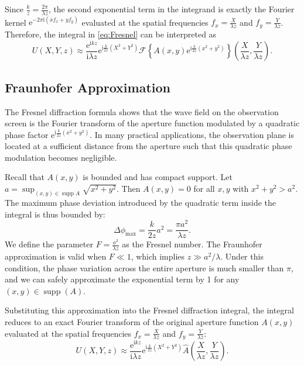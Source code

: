 \documentclass[12pt]{article}
\begin{document}
Since \( \frac{k}{z} = \frac{2 \pi}{\lambda z} \), the second exponential term in the integrand is exactly
the Fourier kernel \( \mathrm{e}^{- 2 \pi \mathrm{i} (x f_x + y f_y)} \) evaluated at the spatial 
frequencies \( f_x = \frac{X}{\lambda z} \) and \( f_y = \frac{Y}{\lambda z} \). Therefore, the integral in
\eqref{eq:Fresnel} can be interpreted as
\[
    U(X, Y, z) \approx \frac{\mathrm{e}^{\mathrm{i} k z}}{\mathrm{i} \lambda z} \mathrm{e}^{\mathrm{i}
    \frac{k}{2z} (X^2 + Y^2)} \mathcal{F} \left\{ A(x, y) \mathrm{e}^{\mathrm{i} \frac{k}{2z} (x^2 + y^2)} 
    \right\} \left( \frac{X}{\lambda z}, \frac{Y}{\lambda z} \right). 
\]

\subsection{Fraunhofer Approximation}

The Fresnel diffraction formula shows that the wave field on the observation screen is the Fourier 
transform of the aperture function modulated by a quadratic phase factor \( \mathrm{e}^{\mathrm{i} \frac{k}{2z} 
(x^2 + y^2)} \). In many practical applications, the observation plane is located at a sufficient 
distance from the aperture such that this quadratic phase modulation becomes negligible.

Recall that \( A(x, y) \) is bounded and has compact support. Let \( a = \sup_{(x, y) \in 
\operatorname{supp} A} \sqrt{x^2 + y^2} \). Then \( A(x, y) = 0 \) for all \( x, y \) with \( x^2 + y^2 > a^2 \).
The maximum phase deviation introduced by the quadratic term inside the integral is thus bounded by:
\[
    \Delta \phi_{\max} = \frac{k}{2z} a^2 = \frac{\pi a^2}{\lambda z}.
\]
We define the parameter \( F = \frac{a^2}{\lambda z} \) as the Fresnel number. The Fraunhofer approximation
is valid when \( F \ll 1 \), which implies \( z \gg a^2 / \lambda \). 
Under this condition, the phase variation across the entire aperture is much smaller than \( \pi \), and we
can safely approximate the exponential term by 1 for any \( (x, y) \in \operatorname{supp}(A) \).

Substituting this approximation into the Fresnel diffraction integral, the integral reduces to an exact 
Fourier transform of the original aperture function \( A(x, y) \) evaluated at the spatial frequencies
\( f_x = \frac{X}{\lambda z} \) and \( f_y = \frac{Y}{\lambda z} \):
\[
    U(X, Y, z) \approx \frac{\mathrm{e}^{\mathrm{i} k z}}{\mathrm{i} \lambda z} \mathrm{e}^{\mathrm{i}
    \frac{k}{2z} (X^2 + Y^2)} \hat{A} \left( \frac{X}{\lambda z}, \frac{Y}{\lambda z} \right).
\]
\end{document}
